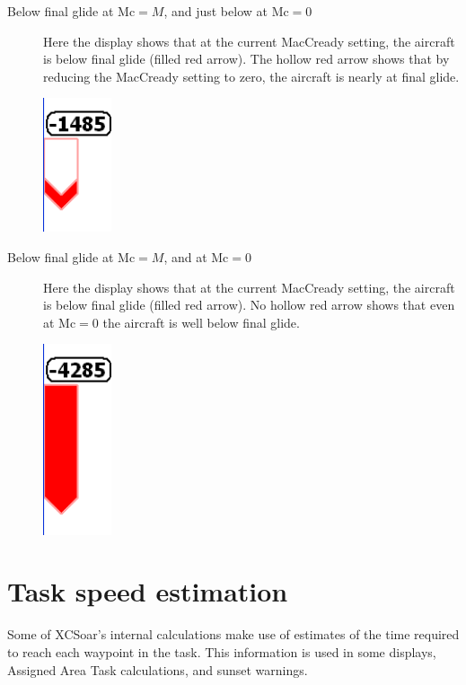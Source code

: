 \documentclass[a4paper,12pt]{refrep}
\begin{document}
\begin{description}
\item[Below final glide at Mc$=M$, and just below at Mc$=0$]
  Here the display shows that at the current MacCready setting, the aircraft
  is below final glide (filled red arrow).  The hollow red arrow
  shows that by reducing the MacCready setting to zero, the aircraft is
  nearly at final glide.
\begin{center}
\includegraphics[angle=0,width=2cm,keepaspectratio='true']{figures/fig-finalglide-littlebelow.png}
\end{center}

\item[Below final glide at Mc$=M$, and at Mc$=0$]
  Here the display shows that at the current MacCready setting, the aircraft
  is below final glide (filled red arrow).  No hollow red arrow
  shows that even at Mc$=0$ the aircraft is well below final glide.
\begin{center}
\includegraphics[angle=0,width=2cm,keepaspectratio='true']{figures/fig-finalglide-allbelow.png}
\end{center}

\end{description}

\section{Task speed estimation}\label{sec:task-speed-estim}

Some of XCSoar's internal calculations make use of estimates of the
time required to reach each waypoint in the task.  This information is
used in some {\InfoBox} displays, Assigned Area Task calculations, and
sunset warnings.
\end{document}
